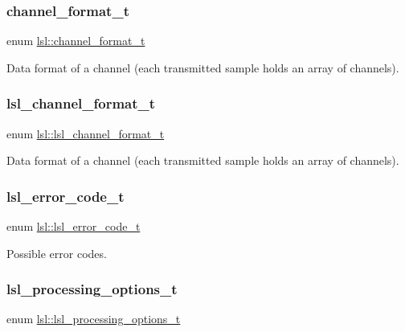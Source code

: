 \subsubsection{\texorpdfstring{channel\+\_\+format\+\_\+t}{channel\_format\_t}}
{\footnotesize\ttfamily enum \hyperlink{namespacelsl_a28d50dae6fd82eea8893ce3d63ccd46c}{lsl\+::channel\+\_\+format\+\_\+t}}

Data format of a channel (each transmitted sample holds an array of channels). \mbox{\label{namespacelsl_af188e978739868560b53dbf0ddd58e66}} 
\subsubsection{\texorpdfstring{lsl\+\_\+channel\+\_\+format\+\_\+t}{lsl\_channel\_format\_t}}
{\footnotesize\ttfamily enum \hyperlink{namespacelsl_af188e978739868560b53dbf0ddd58e66}{lsl\+::lsl\+\_\+channel\+\_\+format\+\_\+t}}

Data format of a channel (each transmitted sample holds an array of channels). \mbox{\label{namespacelsl_a7e674c7665887951b952c463258451a9}} 
\subsubsection{\texorpdfstring{lsl\+\_\+error\+\_\+code\+\_\+t}{lsl\_error\_code\_t}}
{\footnotesize\ttfamily enum \hyperlink{namespacelsl_a7e674c7665887951b952c463258451a9}{lsl\+::lsl\+\_\+error\+\_\+code\+\_\+t}}

Possible error codes. \mbox{\label{namespacelsl_a71fa5faeecfdd863828bdcd4117e736b}} 
\subsubsection{\texorpdfstring{lsl\+\_\+processing\+\_\+options\+\_\+t}{lsl\_processing\_options\_t}}
{\footnotesize\ttfamily enum \hyperlink{namespacelsl_a71fa5faeecfdd863828bdcd4117e736b}{lsl\+::lsl\+\_\+processing\+\_\+options\+\_\+t}}

